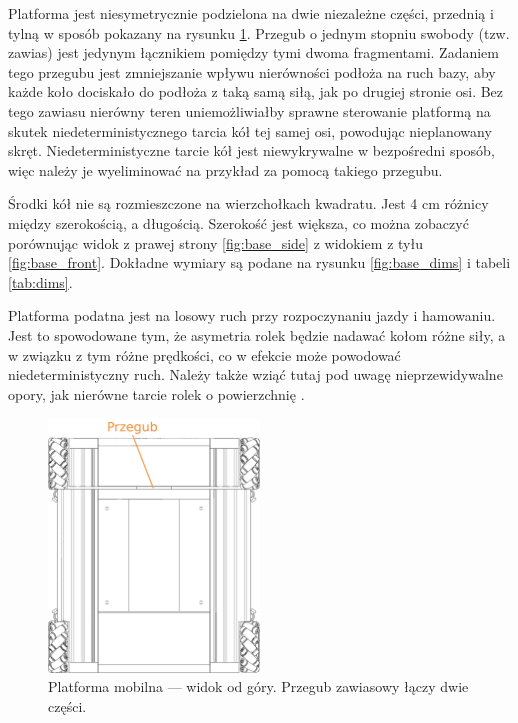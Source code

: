 	Platforma jest niesymetrycznie podzielona na dwie niezależne części, przednią i tylną w sposób pokazany na rysunku \ref{fig:base_top}.
	Przegub o jednym stopniu swobody (tzw. zawias) jest jedynym łącznikiem pomiędzy tymi dwoma fragmentami.
	Zadaniem tego przegubu jest zmniejszanie wpływu nierówności podłoża na ruch bazy, aby każde koło dociskało do podłoża z taką samą siłą, jak po drugiej stronie osi.
	Bez tego zawiasu nierówny teren uniemożliwiałby sprawne sterowanie platformą na skutek niedeterministycznego tarcia kół tej samej osi, powodując nieplanowany skręt.
	Niedeterministyczne tarcie kół jest niewykrywalne w bezpośredni sposób, więc należy je wyeliminować na przykład za pomocą takiego przegubu.

	Środki kół nie są rozmieszczone na wierzchołkach kwadratu. Jest 4 cm różnicy między szerokością, a długością.
	Szerokość jest większa, co można zobaczyć porównując widok z prawej strony \ref{fig:base_side} z widokiem z tyłu \ref{fig:base_front}.
	Dokładne wymiary są podane na rysunku \ref{fig:base_dims} i tabeli \ref{tab:dims}.

	Platforma podatna jest na losowy ruch przy rozpoczynaniu jazdy i hamowaniu.
	Jest to spowodowane tym, że asymetria rolek będzie nadawać kołom różne siły, a w związku z tym różne prędkości, co w efekcie może powodować niedeterministyczny ruch.
	Należy także wziąć tutaj pod uwagę nieprzewidywalne opory, jak nierówne tarcie rolek o powierzchnię \cite{braking}.

	\begin{figure}[H]
	\centering
	\includegraphics[width=0.5\textwidth]{graphics/base_top.png}
	\caption{Platforma mobilna --- widok od góry. Przegub zawiasowy łączy dwie części.}
	\label{fig:base_top}
	\end{figure} 

